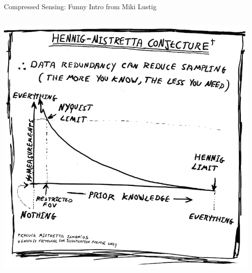 \documentclass[aspectratio=169]{beamer}
\begin{document}
\begin{frame}{Compressed Sensing: Funny Intro from Miki Lustig}
\begin{columns}
			\centering
			\includegraphics[width=\columnwidth]{figures/cs-lustig-comics-02.png}
		\end{columns}
	\end{frame}
	
\end{document}

